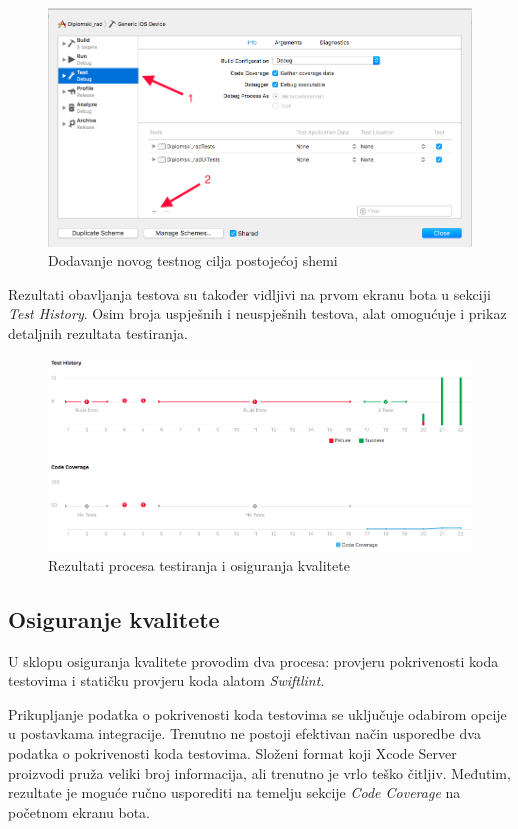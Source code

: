\documentclass[times, utf8, diplomski, numeric]{fer}
\begin{document}
\begin{appendices}
\begin{figure}
\centering
\includegraphics[scale=0.4]{AddingTests}
\caption{Dodavanje novog testnog cilja postojećoj shemi}
\label{fig:AddingTests}
\end{figure}

Rezultati obavljanja testova su također vidljivi na prvom ekranu bota u sekciji \textit{Test History}. Osim broja uspješnih i neuspješnih testova, alat omogućuje i prikaz detaljnih rezultata testiranja.

\begin{figure}[b!]
\centering
\includegraphics[scale=0.4]{XcodeServerTestResult}
\caption{Rezultati procesa testiranja i osiguranja kvalitete}
\label{fig:XcodeServerTestResult}
\end{figure}

\subsection{Osiguranje kvalitete}

U sklopu osiguranja kvalitete provodim dva procesa: provjeru pokrivenosti koda testovima i statičku provjeru koda alatom \textit{Swiftlint}.

Prikupljanje podatka o pokrivenosti koda testovima se uključuje odabirom opcije  u postavkama integracije. Trenutno ne postoji efektivan način usporedbe dva podatka o pokrivenosti koda testovima. Složeni format koji Xcode Server proizvodi pruža veliki broj informacija, ali trenutno je vrlo teško čitljiv. Međutim, rezultate je moguće ručno usporediti na temelju sekcije \textit{Code Coverage} na početnom ekranu bota.


\end{appendices}
\end{document}
